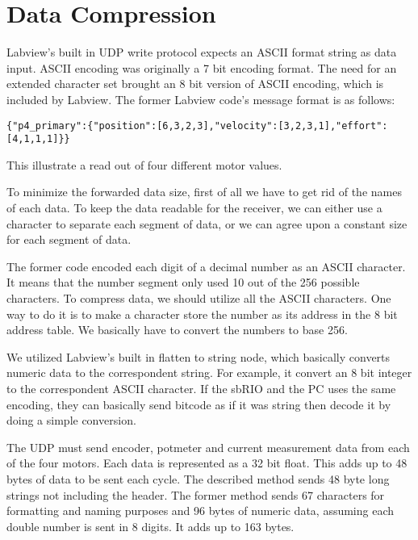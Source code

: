 \section{Data Compression}\label{data_compress}
Labview's built in UDP write protocol expects an ASCII format string as data input. ASCII encoding was originally a 7 bit encoding format. The need for an extended character set brought an 8 bit version of ASCII encoding, which is included by Labview. The former Labview code's message format is as follows:

\begin{verbatim}
{"p4_primary":{"position":[6,3,2,3],"velocity":[3,2,3,1],"effort":[4,1,1,1]}}
\end{verbatim}
This illustrate a read out of four different motor values.

To minimize the forwarded data size, first of all we have to get rid of the names of each data. To keep the data readable for the receiver, we can either use a character to separate each segment of data, or we can agree upon a constant size for each segment of data.

The former code encoded each digit of a decimal number as an ASCII character. It means that the number segment only used 10 out of the 256 possible characters. To compress data, we should utilize all the ASCII characters. One way to do it is to make a character store the number as its address in the 8 bit address table. We basically have to convert the numbers to base 256.

We utilized Labview's built in flatten to string node, which basically converts numeric data to the correspondent string. For example, it convert an 8 bit integer to the correspondent ASCII character. If the sbRIO and the PC uses the same encoding, they can basically send bitcode as if it was string then decode it by doing a simple conversion.  
 

The UDP must send encoder, potmeter and current measurement data from each of the four motors. Each data is represented as a 32 bit float. This adds up to 48 bytes of data to be sent each cycle. The described method sends 48 byte long strings not including the header. The former method sends 67 characters for formatting and naming purposes and 96 bytes of numeric data, assuming each double number is sent in 8 digits. It adds up to 163 bytes.

